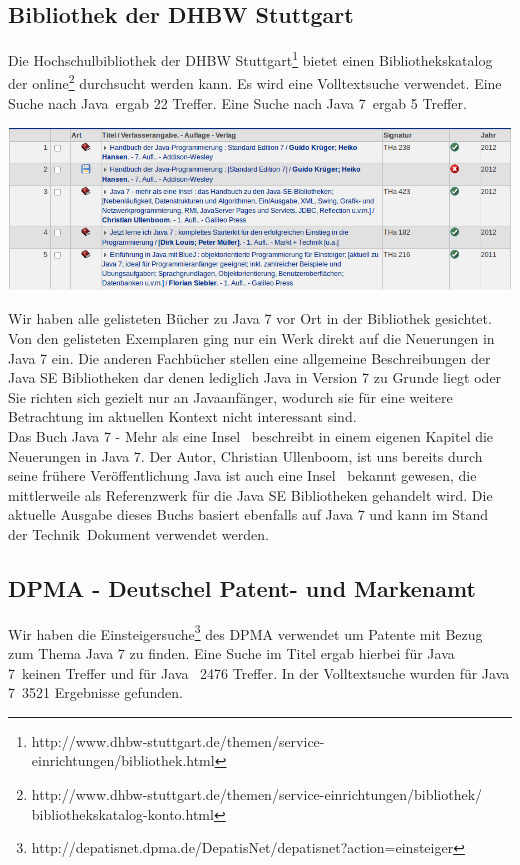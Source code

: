 \label{startdetails}
\subsection{Bibliothek der DHBW Stuttgart}
Die Hochschulbibliothek der DHBW Stuttgart\footnote{http://www.dhbw-stuttgart.de/themen/service-einrichtungen/bibliothek.html} bietet einen Bibliothekskatalog der online\footnote{http://www.dhbw-stuttgart.de/themen/service-einrichtungen/bibliothek/\\bibliothekskatalog-konto.html} durchsucht werden kann. Es wird eine Volltextsuche verwendet. Eine Suche nach \glqq Java\grqq ~ergab 22 Treffer. Eine Suche nach \glqq Java 7\grqq ~ergab 5 Treffer.

\begin{center}
\includegraphics[width=\textwidth]{images/dhbw-lib-search-results.png}
\end{center}

Wir haben alle gelisteten Bücher zu Java 7 vor Ort in der Bibliothek gesichtet. Von den gelisteten Exemplaren ging nur ein Werk\cite{javainsel2} direkt auf die Neuerungen in Java 7 ein. Die anderen Fachbücher stellen eine allgemeine Beschreibungen der Java SE Bibliotheken dar denen lediglich Java in Version 7 zu Grunde liegt\cite{dhLibHandbuchJava} oder Sie richten sich gezielt nur an Javaanfänger\cite{dhLibJetztJavaLernen}\cite{dhLibBlueJStart}, wodurch sie für eine weitere Betrachtung im aktuellen Kontext nicht interessant sind.\\

Das Buch \glqq Java 7 - Mehr als eine Insel\grqq\cite{javainsel2} ~beschreibt in einem eigenen Kapitel die Neuerungen in Java 7. Der Autor, Christian Ullenboom, ist uns bereits durch seine frühere Veröffentlichung \glqq Java ist auch eine Insel\grqq\cite{javainsel1} ~bekannt gewesen, die mittlerweile als Referenzwerk für die Java SE Bibliotheken gehandelt wird. Die aktuelle Ausgabe dieses Buchs basiert ebenfalls auf Java 7 und kann im \glqq Stand der Technik\grqq ~Dokument verwendet werden.

\subsection{DPMA - Deutschel Patent- und Markenamt}
Wir haben die Einsteigersuche\footnote{http://depatisnet.dpma.de/DepatisNet/depatisnet?action=einsteiger} des DPMA verwendet um Patente mit Bezug zum Thema Java 7 zu finden. Eine Suche im Titel ergab hierbei für \glqq Java 7\grqq ~keinen Treffer und für \glqq Java \grqq ~2476 Treffer. In der Volltextsuche wurden für \glqq Java 7\grqq ~3521 Ergebnisse gefunden.\\

